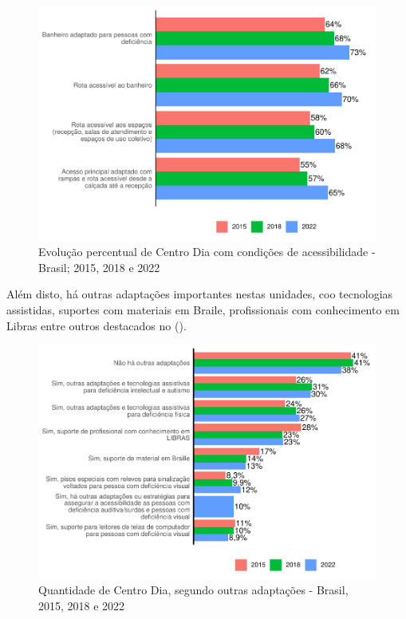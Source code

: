 \documentclass[
  brazilian]{report}
\begin{document}
\begin{figure}
\includegraphics{Censo-SUAS-2022_files/figure-latex/cdia-acessibilidade-1} \caption[Evolução percentual de Centro Dia com condições de acessibilidade - Brasil]{Evolução percentual de Centro Dia com condições de acessibilidade - Brasil; 2015, 2018 e 2022}\label{fig:cdia-acessibilidade}
\end{figure}

Além disto, há outras adaptações importantes nestas unidades, coo
tecnologias assistidas, suportes com materiais em Braile, profissionais
com conhecimento em Libras entre outros destacados no
().

\begin{figure}
\includegraphics{Censo-SUAS-2022_files/figure-latex/cdia_adaptações-1} \caption[Quantidade de Centro Dia, segundo outras adaptações - Brasil, 2015, 2018 e 2022]{Quantidade de Centro Dia, segundo outras adaptações - Brasil, 2015, 2018 e 2022}\label{fig:cdia_adaptações}
\end{figure}
\end{document}
